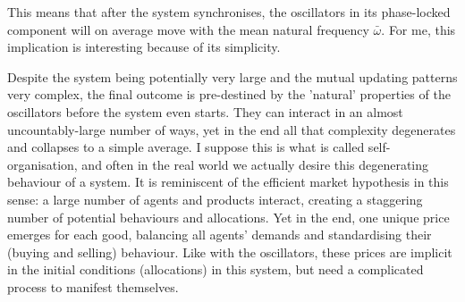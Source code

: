 \documentclass[11pt,a4paper]{article}
\newcommand{\graph}{\medskip\noindent}
\begin{document}
\graph
This means that after the system synchronises, the oscillators in its phase-locked component will on average move with the mean natural frequency $\bar{\omega}$. 
For me, this implication is interesting because of its simplicity. 

Despite the system being potentially very large and the mutual updating patterns very complex, the final outcome is pre-destined by the 'natural' properties of the oscillators before the system even starts. 
They can interact in an almost uncountably-large number of ways, yet in the end all that complexity degenerates and collapses to a simple average. 
I suppose this is what is called self-organisation, and often in the real world we actually desire this degenerating behaviour of a system. 
It is reminiscent of the efficient market hypothesis in this sense: a large number of agents and products interact, creating a staggering number of potential behaviours and allocations. 
Yet in the end, one unique price emerges for each good, balancing all agents' demands and standardising their (buying and selling) behaviour. 
Like with the oscillators, these prices are implicit in the initial conditions (allocations) in this system, but need a complicated process to manifest themselves. 









\end{document}
